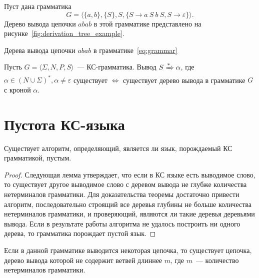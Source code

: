 \begin{example}
    Пуст дана грамматика
    \begin{equation}
        G = \langle \{a,b\}, \{S\}, S, \{S \to a \ S \ b \ S, S \to \varepsilon\} \rangle.\label{eq:grammar}
    \end{equation}
    Дерево вывода цепочки $abab$ в этой грамматике представлено на рисунке~\ref{fig:derivation_tree_example}. 
    
    \begin{marginfigure}
        \begin{center}
            \resizebox{\marginparwidth}{!}{}
        \end{center}
        \caption{Дерева вывода цепочки $abab$ в грамматике~\ref{eq:grammar}}
        \label{fig:derivation_tree_example}
    \end{marginfigure}
    
\end{example}

\begin{theorem}
    Пусть $G = \langle \Sigma, N, P, S \rangle$~--- КС-грамматика.
    Вывод $S \derives \alpha$, где $\alpha \in (N \cup \Sigma)^*, \alpha \neq \varepsilon$ существует $\Leftrightarrow$ существует дерево вывода в грамматике $G$ с кроной $\alpha$.
\end{theorem}

\section{Пустота КС-языка}

\begin{theorem}
    Существует алгоритм, определяющий, является ли язык, порождаемый КС грамматикой, пустым.
\end{theorem}

\begin{proof}
    Следующая лемма утверждает, что если в КС языке есть выводимое слово, то существует другое выводимое слово с деревом вывода не глубже количества нетерминалов грамматики.
    Для доказательства теоремы достаточно привести алгоритм, последовательно строящий все деревья глубины не больше количества нетерминалов грамматики, и проверяющий, являются ли такие деревья деревьями вывода.
    Если в результате работы алгоритма не удалось построить ни одного дерева, то грамматика порождает пустой язык.
\end{proof}

\begin{lemma}
    Если в данной грамматике выводится некоторая цепочка, то существует цепочка, дерево вывода которой не содержит ветвей длиннее $m$, где $m$~--- количество нетерминалов грамматики.
\end{lemma}

